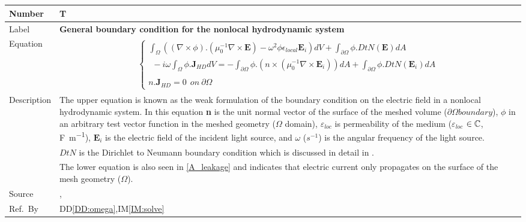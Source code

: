 \documentclass[12pt]{article}
\newcommand{\colAwidth}{0.13\textwidth}
\newcommand{\colBwidth}{0.82\textwidth}
\newcounter{theorynum} %
\begin{document}
~\newline

~\newline

\noindent
\begin{minipage}{\textwidth}
	\renewcommand*{\arraystretch}{1.5}
	\begin{tabular}{| p{\colAwidth} | p{\colBwidth}|}
		\hline
		\rowcolor[gray]{0.9}
		Number& T{theorynum}\thetheorynum \label{TM:boundary}\\
		\hline
		Label&\bf General boundary condition for the nonlocal hydrodynamic system  \\
		\hline
		Equation&  
		\begin{equation}
			\label{eq:boundary}
			\begin{gathered}
				\begin{cases}
					\int_\Omega ((\nabla \times \phi).(\mu^{-1}_{0} \nabla \times \textbf{E})- \omega^2\phi \epsilon_{local} \textbf{E}_i)dV + \int_{\partial \Omega} \phi . DtN(\textbf{E})dA\\ \ \ - i\omega \int_\Omega \phi . \textbf{J}_{HD}dV =  -\int_{\partial \Omega} \phi.(n \times (\mu^{-1}_0 \nabla \times \textbf{E}_i))dA + \int_{\partial \Omega} \phi.DtN(\textbf{E}_i)dA
					\\
					\\
					n.\textbf{J}_{HD}=0 \ \ on \ \partial \Omega 
		\end{cases} \end{gathered}  \end{equation} \\
		
		
		\hline
		Description & 
		The upper equation is known as the weak formulation of the boundary condition on the electric field in a nonlocal hydrodynamic system. In this equation \textbf{n} is the unit normal vector of the surface of the meshed volume ($\partial \Omega boundary$), $\phi$ in an arbitrary test vector function in the meshed geometry ($\Omega$ domain), $\varepsilon_{loc}$ is permeability of the medium ($\varepsilon_{loc}$ $\in \Bbb C$, \si{\farad \per \meter}), $\textbf{E}_i$ is the electric field of the incident light source, and $\omega$ ($s^{-1}$) is the angular frequency of the light source.  
		\\
		&$DtN$ is the Dirichlet to Neumann boundary condition which is discussed in detail in \cite{monk2003finite}.
		\\
		 & The lower equation is also seen in \ref{A_leakage} and indicates that electric current only propagates on the surface of the mesh geometry ($\Omega$).		
		\\
		\hline
		Source & 
		\cite{hiremath2012numerical}, \cite{monk2003finite} \\
		\hline
		Ref.\ By & DD\ref{DD:omega},IM\ref{IM:solve}\\
		\hline
	\end{tabular}
\end{minipage}\\
\end{document}

